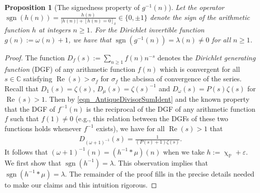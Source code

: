 \documentclass[11pt,reqno,a4letter]{article}
\numberwithin{figure}{section}
\numberwithin{table}{section}
\newcommand{\Iverson}[1]{\ensuremath{\left[#1\right]_{\delta}}}
\renewcommand{\chi}{\upchi}
\theoremstyle{plain}
\newtheorem{prop}[theorem]{Proposition}
\numberwithin{theorem}{section}
\theoremstyle{definition}
\newcommand{\NBRef}[1]{}
\renewcommand{\Re}{\operatorname{Re}}
\begin{document}
\begin{prop}[The signedness property of $g^{-1}(n)$]
\label{prop_SignageDirInvsOfPosBddArithmeticFuncs_v1} 
Let the operator 
$\operatorname{sgn}(h(n)) = \frac{h(n)}{|h(n)| + \Iverson{h(n) = 0}} \in \{0, \pm 1\}$ denote the sign 
of the arithmetic function $h$ at integers $n \geq 1$. 
For the Dirichlet invertible function $g(n) := \omega(n) + 1$, 
we have that $\operatorname{sgn}(g^{-1}(n)) = \lambda(n) \neq 0$ for all $n \geq 1$. 
\NBRef{A02-2020-04-26}
\end{prop} 
\begin{proof} 
The function $D_f(s) := \sum_{n \geq 1} f(n) n^{-s}$ denotes the 
\emph{Dirichlet generating function} (DGF) of any 
arithmetic function $f(n)$ which is convergent for all $s \in \mathbb{C}$ satisfying 
$\Re(s) > \sigma_f$ for $\sigma_f$ the abcissa of convergence of the series. 
Recall that $D_1(s) = \zeta(s)$, $D_{\mu}(s) = \zeta(s)^{-1}$ and $D_{\omega}(s) = P(s) \zeta(s)$ for 
$\Re(s) > 1$. 
Then by \eqref{eqn_AntiqueDivisorSumIdent} and the known property that the DGF of $f^{-1}(n)$ is 
the reciprocal of the DGF of any arithmetic function $f$ such that $f(1) \neq 0$ 
(e.g., this relation between the DGFs of these two functions holds whenever $f^{-1}$ exists), 
we have for all $\Re(s) > 1$ that 
\begin{align} 
\label{eqn_DGF_of_gInvn} 
D_{(\omega+1)^{-1}}(s) = \frac{1}{(P(s)+1) \zeta(s)}. 
\end{align} 
It follows that $(\omega + 1)^{-1}(n) = (h^{-1} \ast \mu)(n)$ when we take 
$h := \chi_{\mathbb{P}} + \varepsilon$. 
We first show that $\operatorname{sgn}(h^{-1}) = \lambda$. 
This observation implies 
that $\operatorname{sgn}(h^{-1} \ast \mu) = \lambda$. The remainder of the proof fills in the 
precise details needed to make our claims and this intuition rigorous. 


\end{proof}
\end{document}
